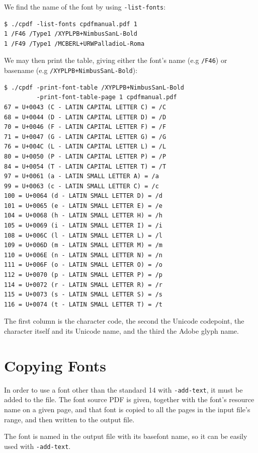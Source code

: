 \documentclass{book}
\begin{document}
We find the name of the font by using \texttt{-list-fonts}:

{\small\begin{verbatim}
$ ./cpdf -list-fonts cpdfmanual.pdf 1
1 /F46 /Type1 /XYPLPB+NimbusSanL-Bold 
1 /F49 /Type1 /MCBERL+URWPalladioL-Roma 
\end{verbatim}}

\noindent We may then print the table, giving either the font's name (e.g \texttt{/F46}) or basename (e.g \texttt{/XYPLPB+NimbusSanL-Bold}):

{\small\begin{verbatim}
$ ./cpdf -print-font-table /XYPLPB+NimbusSanL-Bold
         -print-font-table-page 1 cpdfmanual.pdf
67 = U+0043 (C - LATIN CAPITAL LETTER C) = /C
68 = U+0044 (D - LATIN CAPITAL LETTER D) = /D
70 = U+0046 (F - LATIN CAPITAL LETTER F) = /F
71 = U+0047 (G - LATIN CAPITAL LETTER G) = /G
76 = U+004C (L - LATIN CAPITAL LETTER L) = /L
80 = U+0050 (P - LATIN CAPITAL LETTER P) = /P
84 = U+0054 (T - LATIN CAPITAL LETTER T) = /T
97 = U+0061 (a - LATIN SMALL LETTER A) = /a
99 = U+0063 (c - LATIN SMALL LETTER C) = /c
100 = U+0064 (d - LATIN SMALL LETTER D) = /d
101 = U+0065 (e - LATIN SMALL LETTER E) = /e
104 = U+0068 (h - LATIN SMALL LETTER H) = /h
105 = U+0069 (i - LATIN SMALL LETTER I) = /i
108 = U+006C (l - LATIN SMALL LETTER L) = /l
109 = U+006D (m - LATIN SMALL LETTER M) = /m
110 = U+006E (n - LATIN SMALL LETTER N) = /n
111 = U+006F (o - LATIN SMALL LETTER O) = /o
112 = U+0070 (p - LATIN SMALL LETTER P) = /p
114 = U+0072 (r - LATIN SMALL LETTER R) = /r
115 = U+0073 (s - LATIN SMALL LETTER S) = /s
116 = U+0074 (t - LATIN SMALL LETTER T) = /t
\end{verbatim}}

\noindent The first column is the character code, the second the Unicode codepoint, the character itself and its Unicode name, and the third the Adobe glyph name.




\section{Copying Fonts}
\label{copyfont}

In order to use a font other than the standard 14 with \verb!-add-text!, it
must be added to the file. The font source PDF is given, together with the
font's resource name on a given page, and that font is copied to all the pages
in the input file's range, and then written to the output file.

The font is named in the output file with its basefont name, so it can be
easily used with \verb!-add-text!.
\end{document}
